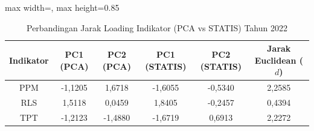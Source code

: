 \begin{table}[H]
\centering
\caption{Perbandingan Jarak Loading Indikator (PCA vs STATIS) Tahun 2022} \label{tab:sample2jarak_loading_2022}
\begin{adjustbox}{max width=\textwidth, max height=0.85\textheight}
\begin{tabular}{|c|c|c|c|c|c|}
\hline
\textbf{Indikator} & \textbf{PC1 (PCA)} & \textbf{PC2 (PCA)} & \textbf{PC1 (STATIS)} & \textbf{PC2 (STATIS)} & \textbf{Jarak Euclidean ($d$)} \\
\hline
PPM & -1,1205 & 1,6718 & -1,6055 & -0,5340 & 2,2585 \\
RLS & 1,5118 & 0,0459 & 1,8405 & -0,2457 & 0,4394 \\
TPT & -1,2123 & -1,4880 & -1,6719 & 0,6913 & 2,2272 \\
\hline
\end{tabular}
\end{adjustbox}
\end{table}